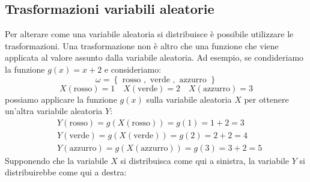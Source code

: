 \subsection{Trasformazioni variabili aleatorie}
Per alterare come una variabile aleatoria si distribuisce è possibile utilizzare le trasformazioni. Una trasformazione non è altro che una funzione che viene applicata al valore assunto dalla variabile aleatoria. Ad esempio, se condideriamo la funzione $ g\left(x\right) = x + 2 $ e consideriamo:
\[
	\omega = \left\{\text{ rosso }, \text{ verde }, \text{ azzurro }\right\}
\]
\[
	X\left(\text{rosso}\right)=1  \quad X \left(\text{verde}\right) = 2 \quad X \left(\text{azzurro}\right) = 3
\]
possiamo applicare la funzione $ g\left(x\right) $ sulla variabile aleatoria $ X $ per ottenere un'altra variabile aleatoria $ Y $:
\begin{align*}
	 & Y\left(\text{rosso}\right)=g\left(X\left(\text{rosso}\right)\right) = g\left(1\right) = 1 + 2 = 3     \\
	 & Y\left(\text{verde}\right)=g\left(X\left(\text{verde}\right)\right) = g\left(2\right) = 2 + 2 = 4     \\
	 & Y\left(\text{azzurro}\right)=g\left(X\left(\text{azzurro}\right)\right) = g\left(3\right) = 3 + 2 = 5
\end{align*}
Supponendo che la variabile $ X $ si distribuisca come qui a sinistra, la variabile $ Y $ si distribuirebbe come qui a destra:
\vskip3mm


